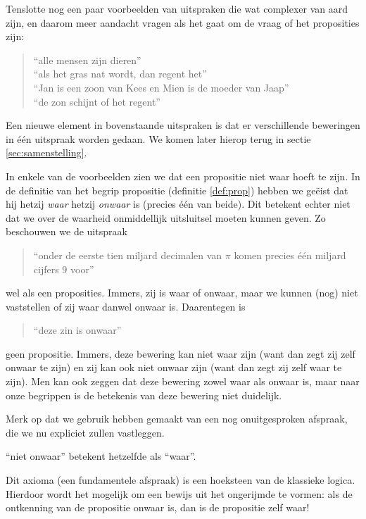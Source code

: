 Tenslotte nog een paar voorbeelden van uitspraken die wat complexer van aard zijn, en daarom meer aandacht vragen als het gaat om de vraag of het proposities zijn:
\begin{quote}\label{q:non:prop}
\enquote{alle mensen zijn dieren}\\
\enquote{als het gras nat wordt, dan regent het}\\
\enquote{Jan is een zoon van Kees en Mien is de moeder van Jaap}\\
\enquote{de zon schijnt of het regent}
\end{quote}

Een nieuwe element in bovenstaande uitspraken is dat er verschillende beweringen in \'e\'en uitspraak worden gedaan. We komen later hierop terug in sectie \ref{sec:samenstelling}.

In enkele van de voorbeelden zien we dat een propositie niet waar hoeft te zijn. In de definitie van het begrip propositie (definitie \ref{def:prop}) hebben we ge\"eist dat hij hetzij \textit{waar} hetzij \textit{onwaar} is (precies \'e\'en van beide). Dit betekent echter niet dat we over de waarheid onmiddellijk uitsluitsel moeten kunnen geven. Zo beschouwen we de uitspraak
\begin{quote}
\enquote{onder de eerste tien miljard decimalen van $\pi$ komen precies \'e\'en miljard cijfers $9$ voor}
\end{quote}
wel als een proposities. Immers, zij is waar of onwaar, maar we kunnen (nog) niet vaststellen of zij waar danwel onwaar is. Daarentegen is
\begin{quote}
\enquote{deze zin is onwaar}
\end{quote}
geen propositie. Immers, deze bewering kan niet waar zijn (want dan zegt zij zelf onwaar te zijn) en zij kan ook niet onwaar zijn (want dan zegt zij zelf waar te zijn). Men kan ook zeggen dat deze bewering zowel waar als onwaar is, maar naar onze begrippen is de betekenis van deze bewering niet duidelijk.

Merk op dat we gebruik hebben gemaakt van een nog onuitgesproken afspraak, die we nu expliciet zullen vastleggen.
\begin{axiom}\label{ax:dubbel}
\enquote{niet onwaar} betekent hetzelfde als \enquote{waar}.
\end{axiom}
Dit axioma (een fundamentele afspraak) is een hoeksteen van de klassieke logica. Hierdoor wordt het mogelijk om een bewijs uit het ongerijmde te vormen: als de ontkenning van de propositie onwaar is, dan is de propositie zelf waar!


